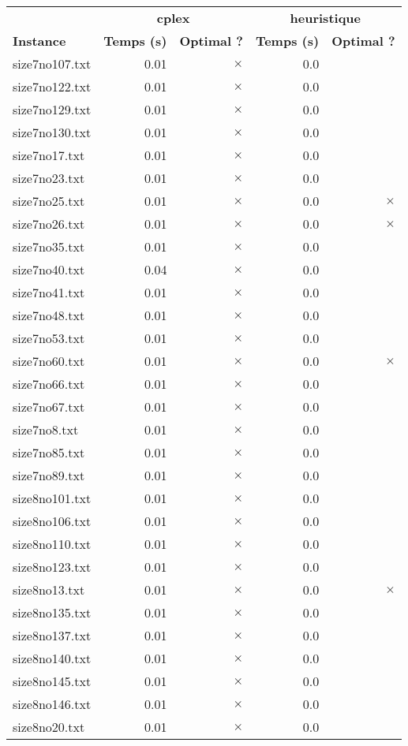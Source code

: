 \documentclass{article}
\begin{document}
\newpage
\begin{center}
\renewcommand{\arraystretch}{1.4} 
 \begin{tabular}{lrrrr}
	\hline
 & \multicolumn{2}{c}{\textbf{cplex}} & \multicolumn{2}{c}{\textbf{heuristique}}\\
\textbf{Instance}  & \textbf{Temps (s)} & \textbf{Optimal ?}  & \textbf{Temps (s)} & \textbf{Optimal ?} \\\hline

size7no107.txt & 0.01 & 
$\times$
 & 0.0 & 
\\
size7no122.txt & 0.01 & 
$\times$
 & 0.0 & 
\\
size7no129.txt & 0.01 & 
$\times$
 & 0.0 & 
\\
size7no130.txt & 0.01 & 
$\times$
 & 0.0 & 
\\
size7no17.txt & 0.01 & 
$\times$
 & 0.0 & 
\\
size7no23.txt & 0.01 & 
$\times$
 & 0.0 & 
\\
size7no25.txt & 0.01 & 
$\times$
 & 0.0 & 
$\times$
\\
size7no26.txt & 0.01 & 
$\times$
 & 0.0 & 
$\times$
\\
size7no35.txt & 0.01 & 
$\times$
 & 0.0 & 
\\
size7no40.txt & 0.04 & 
$\times$
 & 0.0 & 
\\
size7no41.txt & 0.01 & 
$\times$
 & 0.0 & 
\\
size7no48.txt & 0.01 & 
$\times$
 & 0.0 & 
\\
size7no53.txt & 0.01 & 
$\times$
 & 0.0 & 
\\
size7no60.txt & 0.01 & 
$\times$
 & 0.0 & 
$\times$
\\
size7no66.txt & 0.01 & 
$\times$
 & 0.0 & 
\\
size7no67.txt & 0.01 & 
$\times$
 & 0.0 & 
\\
size7no8.txt & 0.01 & 
$\times$
 & 0.0 & 
\\
size7no85.txt & 0.01 & 
$\times$
 & 0.0 & 
\\
size7no89.txt & 0.01 & 
$\times$
 & 0.0 & 
\\
size8no101.txt & 0.01 & 
$\times$
 & 0.0 & 
\\
size8no106.txt & 0.01 & 
$\times$
 & 0.0 & 
\\
size8no110.txt & 0.01 & 
$\times$
 & 0.0 & 
\\
size8no123.txt & 0.01 & 
$\times$
 & 0.0 & 
\\
size8no13.txt & 0.01 & 
$\times$
 & 0.0 & 
$\times$
\\
size8no135.txt & 0.01 & 
$\times$
 & 0.0 & 
\\
size8no137.txt & 0.01 & 
$\times$
 & 0.0 & 
\\
size8no140.txt & 0.01 & 
$\times$
 & 0.0 & 
\\
size8no145.txt & 0.01 & 
$\times$
 & 0.0 & 
\\
size8no146.txt & 0.01 & 
$\times$
 & 0.0 & 
\\
size8no20.txt & 0.01 & 
$\times$
 & 0.0 & 
\\
\hline\end{tabular}
\end{center}
\end{document}
